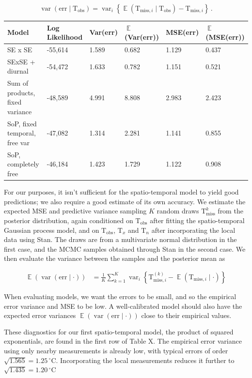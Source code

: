 \documentclass[letter]{article}
\newcommand{\genericdel}[3]{%
      \left#1#3\right#2
    }
\newcommand{\del}[1]{\genericdel(){#1}}
\newcommand{\cbr}[1]{\genericdel\{\}{#1}}
\DeclareMathOperator{\E}{\mathbb{E}}
\DeclareMathOperator{\var}{{var}}
\newcommand{\T}{\mathrm{T}}
\newcommand{\Tn}{\T_{n}}
\newcommand{\Tx}{\T_{x}}
\newcommand{\degreeC}{{}^\circ \mathrm{C}}
\newcommand{\miss}{\mathrm{miss}}
\newcommand{\obs}{\mathrm{obs}}
\newcommand{\error}{\mathrm{err}}
\begin{document}
\begin{equation}
    \label{eq:varerr}
    \var\del{\error \mid \T_\obs} = \var_i \cbr{\E\del{\T_{\miss,i} \mid \T_\obs} - \T_{\miss,i}}\,.
\end{equation}

\begin{longtable}[]{@{}llllll@{}}
\toprule
Model & Log Likelihood & Var(err) & \(\E\)(Var(err)) & MSE(err) &
\(\E\)(MSE(err))\tabularnewline
\midrule
\endhead
SE x SE & -55,614 & 1.589 & 0.682 & 1.129 & 0.437\tabularnewline
SExSE + diurnal & -54,472 & 1.633 & 0.782 & 1.151 & 0.521\tabularnewline
Sum of products, fixed variance & -48,589 & 4.991 & 8.808 & 2.983 &
2.423\tabularnewline
SoP, fixed temporal, free var & -47,082 & 1.314 & 2.281 & 1.141 &
0.855\tabularnewline
SoP, completely free & -46,184 & 1.423 & 1.729 & 1.122 &
0.908\tabularnewline
\bottomrule
\end{longtable}

For our purposes, it isn't sufficient for the spatio-temporal model to
yield good predictions; we also require a good estimate of its own
accuracy. We estimate the expected MSE and predictive variance sampling
\(K\) random draws \(\T^k_\miss\) from the posterior distribution, again
conditioned on \(\T_\obs\) after fitting the spatio-temporal Gaussian
process model, and on \(\T_\obs\), \(\Tx\) and \(\Tn\) after
incorporating the local data using Stan. The draws are from a
multivariate normal distribution in the first case, and the MCMC samples
obtained through Stan in the second case. We then evaluate the variance
between the samples and the posterior mean as

\begin{align}
    \E \del{\var\del{\error \mid \cdot}} &= \frac{1}{K} \sum_{k=1}^K \var_i \cbr{\T^{(k)}_{\miss,i} - \E\del{\T_{\miss,i} \mid \cdot}}
\end{align}

When evaluating models, we want the errors to be small, and so the
empirical error variance and MSE to be low. A well-calibrated model
should also have the expected error variances
\(\E \del{\var\del{\error \mid \cdot}}\) close to their empirical
values.

These diagnostics for our first spatio-temporal model, the product of
squared exponentials, are found in the first row of Table X. The
empirical error variance using only nearby measurements is already low,
with typical errors of order \(\sqrt{1.565}=1.25\,\degreeC\).
Incorporating the local measurements reduces it further to
\(\sqrt{1.435}=1.20\,\degreeC\)
    
\end{document}
